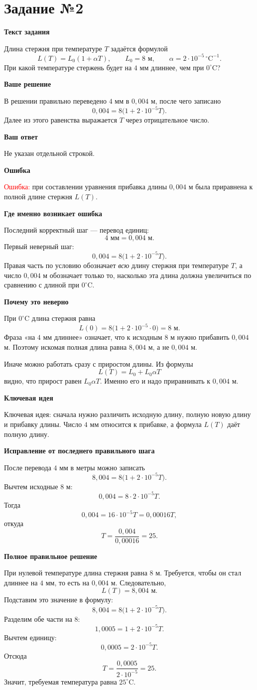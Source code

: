 \documentclass[12pt,a4paper]{article}
\newcommand{\tasktitle}[1]{\section*{Задание №#1}}
\newcommand{\subhead}[1]{\par\medskip\textbf{#1}\par\smallskip}
\begin{document}
\newpage
{}\label{task:2}
\tasktitle{2}

\subhead{Текст задания}
Длина стержня при температуре $T$ задаётся формулой
\[
L(T)=L_0(1+\alpha T),\qquad L_0=8\text{ м},\qquad \alpha=2\cdot10^{-5}\,^{\circ}\mathrm{C}^{-1}.
\]
При какой температуре стержень будет на $4$ мм длиннее, чем при $0^{\circ}\mathrm{C}$?

\subhead{Ваше решение}
В решении правильно переведено $4$ мм в $0{,}004$ м, после чего записано
\[
0{,}004=8\bigl(1+2\cdot10^{-5}T\bigr).
\]
Далее из этого равенства выражается $T$ через отрицательное число.

\subhead{Ваш ответ}
Не указан отдельной строкой.

\subhead{Ошибка}
\textcolor{red}{Ошибка:} при составлении уравнения прибавка длины $0{,}004$ м была приравнена к полной длине стержня $L(T)$.

\subhead{Где именно возникает ошибка}
Последний корректный шаг --- перевод единиц:
\[
4\text{ мм}=0{,}004\text{ м}.
\]
Первый неверный шаг:
\[
0{,}004=8\bigl(1+2\cdot10^{-5}T\bigr).
\]
Правая часть по условию обозначает \emph{всю} длину стержня при температуре $T$, а число $0{,}004$ м обозначает только то, насколько эта длина должна увеличиться по сравнению с длиной при $0^{\circ}\mathrm{C}$.

\subhead{Почему это неверно}
При $0^{\circ}\mathrm{C}$ длина стержня равна
\[
L(0)=8\bigl(1+2\cdot10^{-5}\cdot0\bigr)=8\text{ м}.
\]
Фраза «на $4$ мм длиннее» означает, что к исходным $8$ м нужно прибавить $0{,}004$ м. Поэтому искомая полная длина равна $8{,}004$ м, а не $0{,}004$ м.

Иначе можно работать сразу с приростом длины. Из формулы
\[
L(T)=L_0+L_0\alpha T
\]
видно, что прирост равен $L_0\alpha T$. Именно его и надо приравнивать к $0{,}004$ м.

\subhead{Ключевая идея}
\textcolor{blue!60!black}{Ключевая идея:} сначала нужно различить исходную длину, полную новую длину и прибавку длины. Число $4$ мм относится к прибавке, а формула $L(T)$ даёт полную длину.

\subhead{Исправление от последнего правильного шага}
После перевода $4$ мм в метры можно записать
\[
8{,}004=8\bigl(1+2\cdot10^{-5}T\bigr).
\]
Вычтем исходные $8$ м:
\[
0{,}004=8\cdot2\cdot10^{-5}T.
\]
Тогда
\[
0{,}004=16\cdot10^{-5}T=0{,}00016T,
\]
откуда
\[
T=\frac{0{,}004}{0{,}00016}=25.
\]

\subhead{Полное правильное решение}
При нулевой температуре длина стержня равна $8$ м. Требуется, чтобы он стал длиннее на $4$ мм, то есть на $0{,}004$ м. Следовательно,
\[
L(T)=8{,}004\text{ м}.
\]
Подставим это значение в формулу:
\[
8{,}004=8\bigl(1+2\cdot10^{-5}T\bigr).
\]
Разделим обе части на $8$:
\[
1{,}0005=1+2\cdot10^{-5}T.
\]
Вычтем единицу:
\[
0{,}0005=2\cdot10^{-5}T.
\]
Отсюда
\[
T=\frac{0{,}0005}{2\cdot10^{-5}}=25.
\]
Значит, требуемая температура равна $25^{\circ}\mathrm{C}$.
\end{document}

